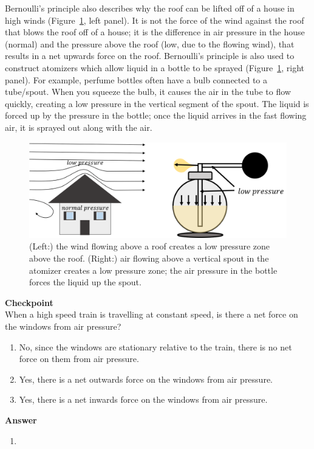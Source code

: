 Bernoulli's principle also describes why the roof can be lifted off of a house in high winds (Figure~\ref{fig:fluidmechanics:roof}, left panel). It is not the force of the wind against the roof that blows the roof off of a house; it is the difference in air pressure in the house (normal) and the pressure above the roof (low, due to the flowing wind), that results in a net upwards force on the roof. Bernoulli's principle is also used to construct atomizers which allow liquid in a bottle to be sprayed (Figure~\ref{fig:fluidmechanics:roof}, right panel). For example, perfume bottles often have a bulb connected to a tube/spout. When you squeeze the bulb, it causes the air in the tube to flow quickly, creating a low pressure in the vertical segment of the spout. The liquid is forced up by the pressure in the bottle; once the liquid arrives in the fast flowing air, it is sprayed out along with the air.

\begin{figure}[!htbp]
\centering
\includegraphics[width=0.8\linewidth]{files/roof-3ea62f3344fa6240b8d895f5aef03f78.png}
\caption[]{(Left:) the wind flowing above a roof creates a low pressure zone above the roof. (Right:) air flowing above a vertical spout in the atomizer creates a low pressure zone; the air pressure in the bottle forces the liquid up the spout.}
\label{fig:fluidmechanics:roof}
\end{figure}

\begin{framed}
\textbf{Checkpoint}\\
When a high speed train is travelling at constant speed, is there a net force on the windows from air pressure?

\begin{enumerate}
\item No, since the windows are stationary relative to the train, there is no net force on them from air pressure.
\item Yes, there is a net outwards force on the windows from air pressure.
\item Yes, there is a net inwards force on the windows from air pressure.
\end{enumerate}

\begin{framed}
\textbf{Answer}\\
\begin{enumerate}[resume]
\item
\end{enumerate}
\end{framed}
\end{framed}

